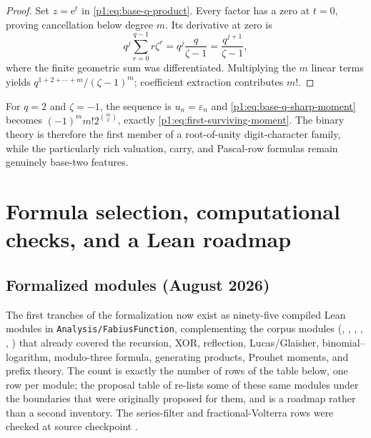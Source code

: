 \documentclass[11pt,oneside]{article}
\numberwithin{equation}{section}
\theoremstyle{definition}
\theoremstyle{remark}
\newcommand{\e}{\mathrm e}
\newcommand{\eps}{\varepsilon}
\newcommand{\repo}{\nolinkurl{Analysis/FabiusFunction}}
\begin{document}
\begin{proof}
Set \(z=\e^t\) in \eqref{p1:eq:base-q-product}.  Every factor has a zero at
\(t=0\), proving cancellation below degree \(m\).  Its derivative at zero is
\begin{equation}
 q^j\sum_{r=0}^{q-1}r\zeta^r
 =q^j\frac{q}{\zeta-1}
 =\frac{q^{j+1}}{\zeta-1},
 \label{p1:eq:root-unity-derivative}
\end{equation}
where the finite geometric sum was differentiated.  Multiplying the \(m\)
linear terms yields
\(q^{1+2+\cdots+m}/(\zeta-1)^m\); coefficient extraction contributes \(m!\).
\end{proof}

For \(q=2\) and \(\zeta=-1\), the sequence is \(u_n=\eps_n\) and
\eqref{p1:eq:base-q-sharp-moment} becomes
\((-1)^mm!2^{\binom m2}\), exactly
\eqref{p1:eq:first-surviving-moment}.  The binary theory is therefore the first
member of a root-of-unity digit-character family, while the particularly rich
valuation, carry, and Pascal-row formulas remain genuinely base-two features.

\section[Formula selection and Lean roadmap]{Formula selection, computational checks, and a Lean roadmap}
\label{p1:sec:formalization}

\subsection{Formalized modules (August 2026)}
\label{p1:sec:formalized-modules}

The first tranches of the formalization now exist as ninety-five
compiled Lean modules in \repo{}, complementing the corpus modules
(, , ,
, ,
) that already covered the recursion,
XOR, reflection, Lucas/Glaisher, binomial--logarithm, modulo-three
formula, generating products, Prouhet moments, and prefix theory.  The
count is exactly the number of rows of the table below, one row per
module; the proposal table of  re-lists
some of these same modules under the boundaries that were originally
proposed for them, and is a roadmap rather than a second inventory.  The
series-filter and fractional-Volterra rows were checked at source
checkpoint .
\end{document}
